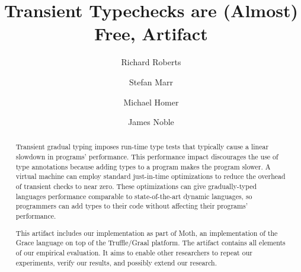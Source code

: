 \documentclass[a4paper,USenglish]{darts-v2019}
\title{Transient Typechecks are (Almost) Free, Artifact}
\author{Richard Roberts}{School of Design, Victoria University of Wellington}{rykardo.r@gmail.com}{https://orcid.org/0000-0002-3462-8539}{}
\author{Stefan Marr}{School of Computing, University of Kent}{s.marr@kent.ac.uk}{https://orcid.org0000-0001-9059-5180}{}
\author{Michael Homer}{School of Engineering and Computer Science, Victoria University of Wellington}{mwh@ecs.vuw.ac.nz}{}{}
\author{James Noble}{School of Engineering and Computer Science, Victoria University of Wellington}{kjx@ecs.vuw.ac.nz}{https://orcid.org/0000-0001-9036-5692}{}
\begin{document}
\maketitle

\begin{abstract}

  Transient gradual typing imposes run-time type tests that typically cause a
  linear slowdown in programs' performance.
  This performance impact discourages the use of type annotations
  because adding types to a program makes the program slower.
  A virtual machine can employ standard just-in-time optimizations to
  reduce the overhead of transient checks to near zero.
  These optimizations can give gradually-typed languages
  performance comparable to state-of-the-art dynamic languages,
  so programmers can add types to their code
  without affecting their programs' performance.

  This artifact includes our implementation as part of Moth,
  an implementation of the Grace language on top of the Truffle/Graal platform.
  The artifact contains all elements of our empirical evaluation.
  It aims to enable other researchers to repeat our experiments,
  verify our results, and possibly extend our research.
 \end{abstract}

\end{document}
